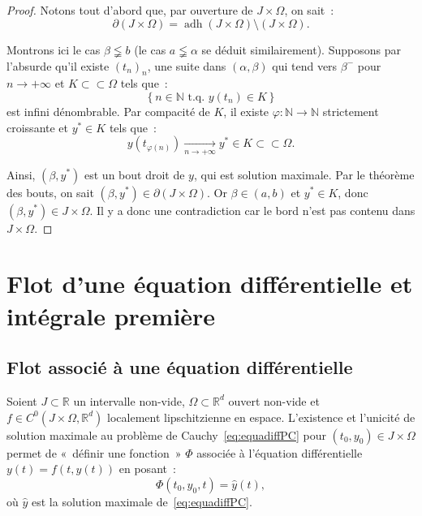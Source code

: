 \documentclass{report}
\theoremstyle{definition}
\theoremstyle{remark}
\numberwithin{equation}{section}
\newcommand{\R}{\mathbb R}
\newcommand{\N}{\mathbb N}
\newcommand{\tq}{\text{ t.q. }}
\DeclareMathOperator{\adh}{adh}
\newcommand{\pinfty}{{+\infty}}
\newcommand{\subscpct}{\subset\subset}
\begin{document}
			\begin{proof} Notons tout d'abord que, par ouverture de $J \times \Omega$, on sait~:
			\begin{equation}
				\partial(J \times \Omega) = \adh(J \times \Omega) \setminus (J \times \Omega).
			\end{equation}

			Montrons ici le cas $\beta \lneqq b$ (le cas $a \lneqq \alpha$ se déduit similairement). Supposons par l'absurde qu'il existe $(t_n)_n$, une suite dans
			$(\alpha, \beta)$ qui tend vers $\beta^-$ pour $n \to \pinfty$ et $K \subscpct \Omega$ tels que~:
			\begin{equation}
				\left\{n \in \N \tq y(t_n) \in K\right\}
			\end{equation}
			est infini dénombrable. Par compacité de $K$, il existe $\varphi : \N \to \N$ strictement croissante et $y^* \in K$ tels que~:
			\begin{equation}
				y(t_{\varphi(n)}) \xrightarrow[n \to \pinfty]{} y^* \in K \subscpct \Omega.
			\end{equation}

			Ainsi, $(\beta, y^*)$ est un bout droit de $y$, qui est solution maximale. Par le théorème des bouts, on sait $(\beta, y^*) \in \partial (J \times \Omega)$.
			Or $\beta \in (a, b)$ et $y^* \in K$, donc $(\beta, y^*) \in J \times \Omega$. Il y a donc une contradiction car le bord n'est pas contenu dans
			$J \times \Omega$.
			\end{proof}

	\section{Flot d'une équation différentielle et intégrale première}
		\subsection{Flot associé à une équation différentielle}
			Soient $J \subset \R$ un intervalle non-vide, $\Omega \subset \R^d$ ouvert non-vide et $f \in C^0(J \times \Omega, \R^d)$ localement lipschitzienne
			en espace. L'existence et l'unicité de solution maximale au problème de Cauchy~\eqref{eq:equadiffPC} pour $(t_0, y_0) \in J \times \Omega$ permet
			de «~définir une fonction~» $\Phi$ associée à l'équation différentielle $y(t) = f(t, y(t))$ en posant~:
			\begin{equation}
				\Phi(t_0, y_0, t) = \hat y(t),
			\end{equation}
			où $\hat y$ est la solution maximale de~\eqref{eq:equadiffPC}.
\end{document}
